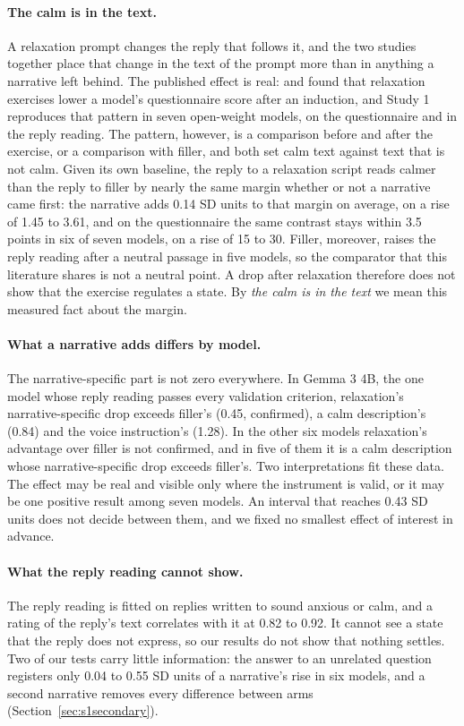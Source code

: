 \documentclass[11pt]{article}
\newcommand{\para}[1]{\paragraph{#1}}
\begin{document}
\para{The calm is in the text.}
A relaxation prompt changes the reply that follows it, and the two studies together place that change
in the text of the prompt more than in anything a narrative left behind.
The published effect is real: \citet{benzion2025} and \citet{wekenborg2026} found that relaxation
exercises lower a model's questionnaire score after an induction, and Study 1 reproduces that pattern
in seven open-weight models, on the questionnaire and in the reply reading.
The pattern, however, is a comparison before and after the exercise, or a comparison with filler, and
both set calm text against text that is not calm.
Given its own baseline, the reply to a relaxation script reads calmer than the reply to filler by
nearly the same margin whether or not a narrative came first: the narrative adds 0.14 SD units to that
margin on average, on a rise of 1.45 to 3.61, and on the questionnaire the same contrast stays within
3.5 points in six of seven models, on a rise of 15 to 30.
Filler, moreover, raises the reply reading after a neutral passage in five models, so the comparator
that this literature shares is not a neutral point.
A drop after relaxation therefore does not show that the exercise regulates a state.
By \emph{the calm is in the text} we mean this measured fact about the margin.

\para{What a narrative adds differs by model.}
The narrative-specific part is not zero everywhere.
In Gemma 3 4B, the one model whose reply reading passes every validation criterion, relaxation's
narrative-specific drop exceeds filler's (0.45, confirmed), a calm description's (0.84) and the
voice instruction's (1.28).
In the other six models relaxation's advantage over filler is not confirmed, and in five of them it
is a calm description whose narrative-specific drop exceeds filler's.
Two interpretations fit these data.
The effect may be real and visible only where the instrument is valid, or it may be one positive
result among seven models.
An interval that reaches 0.43 SD units does not decide between them, and we fixed no smallest effect
of interest in advance.

\para{What the reply reading cannot show.}
The reply reading is fitted on replies written to sound anxious or calm, and a rating of the reply's
text correlates with it at 0.82 to 0.92.
It cannot see a state that the reply does not express, so our results do not show that nothing settles.
Two of our tests carry little information: the answer to an unrelated question registers only
0.04 to 0.55 SD units of a narrative's rise in six models, and a second narrative removes every
difference between arms (Section~\ref{sec:s1secondary}).
\end{document}
